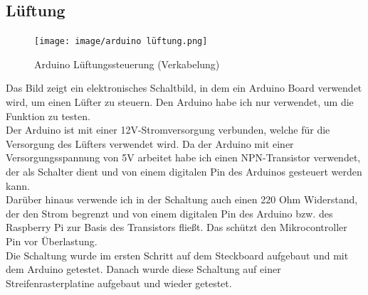 \subsection{Lüftung}\label{sec: Lüftung}
\begin{figure}[H]
    \centering
    \texttt{[image: image/arduino lüftung.png]}
    \caption{Arduino Lüftungssteuerung (Verkabelung)\autocite{SchaltungLüfter}}
    \label{fig:enter-label}
\end{figure}
\vspace{3mm}
Das Bild zeigt ein elektronisches Schaltbild, in dem ein Arduino\autocite{Arduino} Board verwendet wird, um einen Lüfter zu steuern. Den Arduino habe ich nur verwendet, um die Funktion zu testen.\\
\vspace{3mm}
Der Arduino ist mit einer 12V-Stromversorgung verbunden, welche für die Versorgung des Lüfters verwendet wird. Da der Arduino mit einer Versorgungsspannung von 5V arbeitet habe ich einen NPN-Transistor verwendet, der als Schalter dient und von einem digitalen Pin des Arduinos gesteuert werden kann. \\
\vspace{3mm}
Darüber hinaus verwende ich in der Schaltung auch einen 220 Ohm Widerstand, der den Strom begrenzt und von einem digitalen Pin des Arduino bzw. des Raspberry Pi zur Basis des Transistors fließt. Das schützt den Mikrocontroller Pin vor Überlastung. \\
\vspace{3mm}
Die Schaltung wurde im ersten Schritt auf dem Steckboard aufgebaut und mit dem Arduino getestet. Danach wurde diese Schaltung auf einer Streifenrasterplatine aufgebaut und wieder getestet.\\

